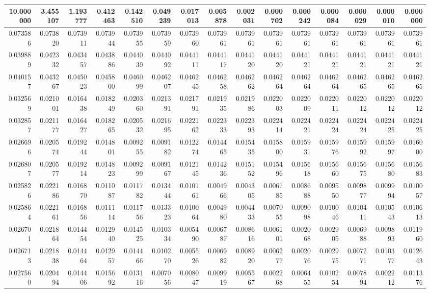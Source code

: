 \begin{tabular}{rrrrrrrrrrrrrrr}
\toprule
10.000000 & 3.455107 & 1.193777 & 0.412463 & 0.142510 & 0.049239 & 0.017013 & 0.005878 & 0.002031 & 0.000702 & 0.000242 & 0.000084 & 0.000029 & 0.000010 & 0.000000 \\
\midrule
0.073586 & 0.073820 & 0.073911 & 0.073944 & 0.073955 & 0.073959 & 0.073960 & 0.073961 & 0.073961 & 0.073961 & 0.073961 & 0.073961 & 0.073961 & 0.073961 & 0.073961 \\
0.039889 & 0.042332 & 0.043457 & 0.043886 & 0.044039 & 0.044092 & 0.044111 & 0.044117 & 0.044120 & 0.044120 & 0.044121 & 0.044121 & 0.044121 & 0.044121 & 0.044121 \\
0.040157 & 0.043267 & 0.045023 & 0.045800 & 0.046099 & 0.046207 & 0.046245 & 0.046258 & 0.046262 & 0.046264 & 0.046264 & 0.046264 & 0.046265 & 0.046265 & 0.046265 \\
0.032569 & 0.021001 & 0.016438 & 0.018249 & 0.020360 & 0.021391 & 0.021791 & 0.021935 & 0.021986 & 0.022003 & 0.022009 & 0.022011 & 0.022012 & 0.022012 & 0.022012 \\
0.032857 & 0.021177 & 0.016427 & 0.018265 & 0.020532 & 0.021695 & 0.022162 & 0.022333 & 0.022393 & 0.022414 & 0.022421 & 0.022424 & 0.022424 & 0.022425 & 0.022425 \\
0.026696 & 0.020574 & 0.019244 & 0.014801 & 0.009255 & 0.009182 & 0.012274 & 0.014465 & 0.015435 & 0.015800 & 0.015931 & 0.015976 & 0.015992 & 0.015997 & 0.016000 \\
0.026807 & 0.020577 & 0.019214 & 0.014823 & 0.009299 & 0.009167 & 0.012145 & 0.014236 & 0.015152 & 0.015496 & 0.015618 & 0.015660 & 0.015675 & 0.015680 & 0.015683 \\
0.025826 & 0.022186 & 0.016870 & 0.011087 & 0.011782 & 0.013444 & 0.010161 & 0.004966 & 0.004305 & 0.006785 & 0.008688 & 0.009550 & 0.009877 & 0.009994 & 0.010057 \\
0.025864 & 0.022161 & 0.016856 & 0.011114 & 0.011756 & 0.013323 & 0.010064 & 0.004980 & 0.004433 & 0.007055 & 0.009098 & 0.010046 & 0.010411 & 0.010543 & 0.010613 \\
0.026701 & 0.021864 & 0.014454 & 0.012940 & 0.014525 & 0.010334 & 0.005490 & 0.006787 & 0.008616 & 0.006101 & 0.002068 & 0.002905 & 0.006988 & 0.009893 & 0.011960 \\
0.026713 & 0.021838 & 0.014464 & 0.012957 & 0.014466 & 0.010270 & 0.005526 & 0.006982 & 0.008920 & 0.006277 & 0.002076 & 0.002975 & 0.007271 & 0.010377 & 0.012643 \\
0.027560 & 0.020494 & 0.014406 & 0.015692 & 0.013116 & 0.007056 & 0.008047 & 0.009919 & 0.005567 & 0.002268 & 0.006455 & 0.010254 & 0.007894 & 0.002212 & 0.011376 \\

\end{tabular}
